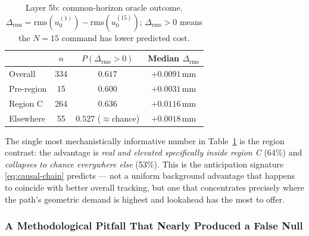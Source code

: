 \documentclass[journal]{IEEEtran}
\begin{document}
\begin{table}[t]
\centering
\caption{Layer 5b: common-horizon oracle outcome. $\Delta_{\mathrm{rms}} = \mathrm{rms}(u_0^{(1)}) - \mathrm{rms}(u_0^{(15)})$; $\Delta_{\mathrm{rms}}{>}0$ means the $N{=}15$ command has lower predicted cost.}
\label{tab:oracle}
\begin{tabular}{@{}lccc@{}}
\toprule
 & $n$ & $P(\Delta_{\mathrm{rms}}{>}0)$ & Median $\Delta_{\mathrm{rms}}$ \\
\midrule
Overall & 334 & $0.617$ & $+0.0091\,\mathrm{mm}$ \\
Pre-region & 15 & $0.600$ & $+0.0031\,\mathrm{mm}$ \\
Region C & 264 & $\mathbf{0.636}$ & $+0.0116\,\mathrm{mm}$ \\
Elsewhere & 55 & $\mathbf{0.527}$ ($\approx$chance) & $+0.0018\,\mathrm{mm}$ \\
\bottomrule
\end{tabular}
\end{table}

The single most mechanistically informative number in
Table~\ref{tab:oracle} is the region contrast: the advantage is
\emph{real and elevated specifically inside region C} (64\%) and
\emph{collapses to chance everywhere else} (53\%). This is the
anticipation signature \eqref{eq:causal-chain} predicts --- not a
uniform background advantage that happens to coincide with better
overall tracking, but one that concentrates precisely where the
path's geometric demand is highest and lookahead has the most to
offer.

\subsubsection{A Methodological Pitfall That Nearly Produced a False Null}
\label{sec:ph-oracle-bug}
\end{document}
